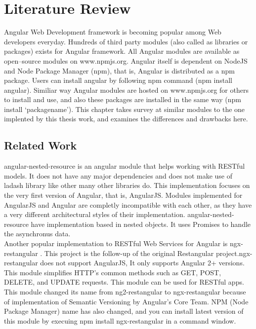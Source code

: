 \chapter{Literature Review}
\pagestyle{fancy}
\fancyhead[LO]{\itshape\nouppercase{\rightmark}}

\hspace{0.2in} Angular Web Development framework is becoming popular among Web developers everyday. Hundreds of third party modules (also called as libraries or packages) exists for Angular framework. All Angular modules are available as open--source modules on www.npmjs.org. Angular itself is dependent on NodeJS and Node Package Manager (npm), that is, Angular is distributed as a npm package. Users can install angular by following npm command (npm install angular). Similiar way Angular modules are hosted on www.npmjs.org for others to install and use, and also these packages are installed in the same way (npm install `packagename'). This chapter takes survey at similar modules to the one implented by this thesis work, and examines the differences and drawbacks here.

\section{Related Work}

\hspace{0.2in}angular-nested-resource \cite{angular-nested-resource} is an angular module that helps working with RESTful models. It does not have any major dependencies and does not make use of ladash library like other many other libraries do. 
This implementation focuses on the very first version of Angular, that is, AngularJS. Modules implemented for AngularJS and Angular are completly incompatible with each other, as they have a very different architectural styles of their implementation.
angular-nested-resource have implementation based in nested objects. It uses Promises to handle the asynchronus data. \\

\hspace{0.2in} Another popular implementation to  RESTful Web Services for Angular is ngx-restangular \cite{ngx-restangular}. This project is the follow-up of the original Restangular project.ngx-restangular does not support AngularJS, It only supports Angular 2+ versions. This module simplifies HTTP's common methods such as  GET, POST, DELETE, and UPDATE requests. This module can be used for RESTful apps. This module changed its name from ng2-restangular to ngx-restangular because of implementation of Semantic Versioning by Angular's Core Team. NPM (Node Package Manager) name has also changed, and you can install latest version of  this module by execuing npm install ngx-restangular in a command window.\\

